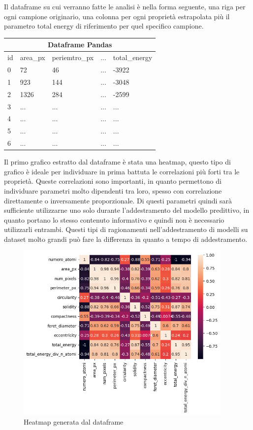 \documentclass[12pt,a4paper,openright,twoside]{report}
\begin{document}
Il dataframe su cui verranno fatte le analisi è nella forma seguente, una riga per ogni campione originario, una colonna per ogni proprietà estrapolata più il parametro total energy di riferimento per quel specifico campione. 

\begin{center}
\begin{tabular}{ |p{1cm}||p{1.5cm}|p{2.5cm}|p{1cm}|p{3cm}|  }
 \hline
 \multicolumn{5}{|c|}{Dataframe Pandas} \\
 \hline
 id & area\_px & periemtro\_px & ... & total\_energy \\
 \hline
 0 & 72 & 46 & ... & -3922\\
 1 & 923 & 144 & ... & -3048\\
 2 & 1326 & 284 & ... & -2599\\
 3 & ... & ... & ... & ...\\
 4 & ... & ... & ... & ...\\
 5 & ... & ... & ... & ...\\
 6 & ... & ... & ... & ...\\
 \hline
\end{tabular}    
\end{center}
Il primo grafico estratto dal dataframe è stata una heatmap, questo tipo di grafico è ideale per individuare in prima battuta le correlazioni più forti tra le proprietà.
Queste correlazioni sono importanti, in quanto permettono di individuare parametri molto dipendenti tra loro, spesso con correlazione direttamente o inversamente proporzionale. 
Di questi parametri quindi sarà sufficiente utilizzarne uno solo durante l'addestramento del modello predittivo, in quanto portano lo stesso contenuto informativo e quindi non è necessario utilizzarli entrambi. Questi tipi di ragionamenti nell'addestramento di modelli su dataset molto grandi può fare la differenza in quanto a tempo di addestramento.
\begin{center}
\begin{figure}[h]
\centering
\includegraphics[width=400px,keepaspectratio]{heatmap.png}
\caption{Heatmap generata dal dataframe}
\end{figure}    
\end{center}
\end{document}
